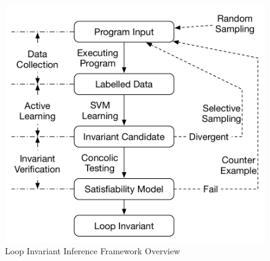 \begin{figure}[t]
    \centering
    \includegraphics[scale=0.45]{figures/overview.pdf}
    \caption{Loop Invariant Inference Framework Overview}
    \label{fig:overview}
\end{figure}


